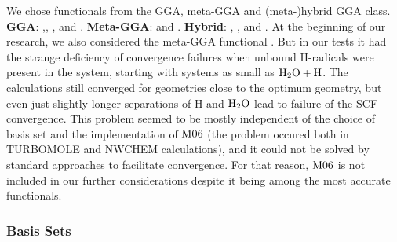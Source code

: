 We chose functionals from the GGA, meta-GGA and \mbox{(meta-)}hybrid GGA
class.\newline
\textbf{GGA}: \bp,\cite{Becke1988,Perdew1986},
\blyp,\cite{Becke1988,LeeYangParr1988} {\pbe}\cite{PerdewErnzerhofBurke1996}
and \bns.\cite{GrimmeB97-D2006}
\newline
\textbf{Meta-GGA}: \tpss\cite{TaoPerdewStaroverovEtAl2003}
and \pw.\cite{ZhaoTruhlar2005}
\newline \textbf{Hybrid}:
\btlyp,\cite{Becke1993,StephensDevlinChabalowskiEtAl1994} 
{\bhlyp,}\cite{Becke1993BHLYP}
{\tpssh}\cite{TaoPerdewStaroverovEtAl2003,StaroverovScuseriaTaoEtAl2003} and
\pbez.\cite{PerdewErnzerhofBurke1996,AdamoBarone1999}
\newline
At the beginning of our research, we also considered the meta-GGA functional
\mos.\cite{ZhaoTruhlar2007} But in our tests it had the strange deficiency of
convergence failures when unbound H-radicals were present in the system,
starting with systems as small as $\text H _2 \text O + \text H$.
The calculations still converged for geometries close to the optimum geometry,
but even just slightly longer separations of H and $\text H _2 \text O$ lead to failure
of the SCF convergence. This problem seemed to be mostly independent of the
choice of basis set and the implementation of $\text{M06}$ (the problem occured both
in TURBOMOLE\cite{TURBOMOLE} and NWCHEM\cite{ValievBylaskaGovindEtAl2010}
calculations), and it could not be solved by standard approaches to facilitate
convergence. For that reason, $\text{M06}$ is not included in our further
considerations despite it being among the most accurate functionals.

\subsubsection{Basis Sets}
\label{Sec:Theo:Basis}

